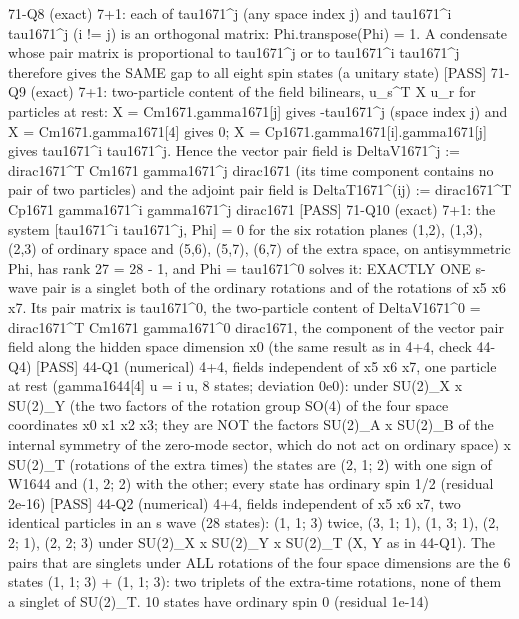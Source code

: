 \documentclass[
  10pt,
]{article}
\newenvironment{Shaded}{}{}
\newcommand{\NormalTok}[1]{#1}
\begin{document}
\begin{Shaded}
\begin{Highlighting}[]
\NormalTok{[PASS] 71{-}Q8  (exact) 7+1: each of tau1671\^{}j (any space index j) and tau1671\^{}i tau1671\^{}j (i != j) is an orthogonal matrix: Phi.transpose(Phi) = 1.  A condensate whose pair matrix is proportional to tau1671\^{}j or to tau1671\^{}i tau1671\^{}j therefore gives the SAME gap to all eight spin states (a \textquotesingle{}unitary\textquotesingle{} state)}
\NormalTok{[PASS] 71{-}Q9  (exact) 7+1: two{-}particle content of the field bilinears, u\_s\^{}T X u\_r for particles at rest: X = Cm1671.gamma1671[j] gives {-}tau1671\^{}j (space index j) and X = Cm1671.gamma1671[4] gives 0; X = Cp1671.gamma1671[i].gamma1671[j] gives tau1671\^{}i tau1671\^{}j.  Hence the vector pair field is DeltaV1671\^{}j := dirac1671\^{}T Cm1671 gamma1671\^{}j dirac1671 (its time component contains no pair of two particles) and the adjoint pair field is DeltaT1671\^{}(ij) := dirac1671\^{}T Cp1671 gamma1671\^{}i gamma1671\^{}j dirac1671}
\NormalTok{[PASS] 71{-}Q10  (exact) 7+1: the system [tau1671\^{}i tau1671\^{}j, Phi] = 0 for the six rotation planes (1,2), (1,3), (2,3) of ordinary space and (5,6), (5,7), (6,7) of the extra space, on antisymmetric Phi, has rank 27 = 28 {-} 1, and Phi = tau1671\^{}0 solves it: EXACTLY ONE s{-}wave pair is a singlet both of the ordinary rotations and of the rotations of x5 x6 x7.  Its pair matrix is tau1671\^{}0, the two{-}particle content of DeltaV1671\^{}0 = dirac1671\^{}T Cm1671 gamma1671\^{}0 dirac1671, the component of the vector pair field along the hidden space dimension x0 (the same result as in 4+4, check 44{-}Q4)}
\NormalTok{[PASS] 44{-}Q1  (numerical) 4+4, fields independent of x5 x6 x7, one particle at rest (gamma1644[4] u = i u, 8 states; deviation 0e0): under SU(2)\_X x SU(2)\_Y (the two factors of the rotation group SO(4) of the four space coordinates x0 x1 x2 x3; they are NOT the factors SU(2)\_A x SU(2)\_B of the internal symmetry of the zero{-}mode sector, which do not act on ordinary space) x SU(2)\_T (rotations of the extra times) the states are (2, 1; 2) with one sign of W1644 and (1, 2; 2) with the other; every state has ordinary spin 1/2 (residual 2e{-}16)}
\NormalTok{[PASS] 44{-}Q2  (numerical) 4+4, fields independent of x5 x6 x7, two identical particles in an s wave (28 states): (1, 1; 3) twice, (3, 1; 1), (1, 3; 1), (2, 2; 1), (2, 2; 3) under SU(2)\_X x SU(2)\_Y x SU(2)\_T (X, Y as in 44{-}Q1).  The pairs that are singlets under ALL rotations of the four space dimensions are the 6 states (1, 1; 3) + (1, 1; 3): two triplets of the extra{-}time rotations, none of them a singlet of SU(2)\_T.  10 states have ordinary spin 0 (residual 1e{-}14)}

\end{Highlighting}
\end{Shaded}
\end{document}

